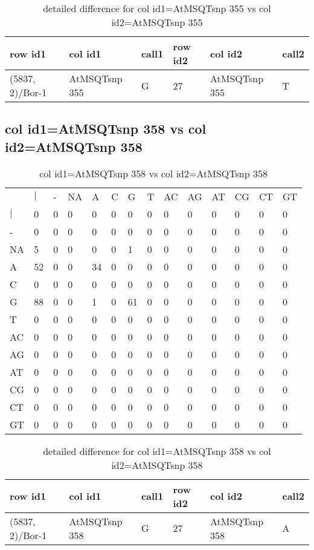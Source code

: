 \begin{center}
\begin{longtable}{|l|l|l|l|l|l|}
\caption{detailed difference for col id1=AtMSQTsnp 355 vs col id2=AtMSQTsnp 355} \label{table_dm675}\\
\hline
row id1&col id1&call1&row id2&col id2&call2\\
\hline
(5837, 2)/Bor-1&AtMSQTsnp 355&G&27&AtMSQTsnp 355&T\\
\hline
\end{longtable}
\end{center}

\subsection{col id1=AtMSQTsnp 358 vs col id2=AtMSQTsnp 358}
\begin{center}
\begin{longtable}{|l|l|l|l|l|l|l|l|l|l|l|l|l|l|}
\caption{col id1=AtMSQTsnp 358 vs col id2=AtMSQTsnp 358} \label{table_dm676}\\
\hline
\\
\hline
&$|$&-&NA&A&C&G&T&AC&AG&AT&CG&CT&GT\\
$|$&0&0&0&0&0&0&0&0&0&0&0&0&0\\
-&0&0&0&0&0&0&0&0&0&0&0&0&0\\
NA&5&0&0&0&0&1&0&0&0&0&0&0&0\\
A&52&0&0&34&0&0&0&0&0&0&0&0&0\\
C&0&0&0&0&0&0&0&0&0&0&0&0&0\\
G&88&0&0&1&0&61&0&0&0&0&0&0&0\\
T&0&0&0&0&0&0&0&0&0&0&0&0&0\\
AC&0&0&0&0&0&0&0&0&0&0&0&0&0\\
AG&0&0&0&0&0&0&0&0&0&0&0&0&0\\
AT&0&0&0&0&0&0&0&0&0&0&0&0&0\\
CG&0&0&0&0&0&0&0&0&0&0&0&0&0\\
CT&0&0&0&0&0&0&0&0&0&0&0&0&0\\
GT&0&0&0&0&0&0&0&0&0&0&0&0&0\\
\hline
\end{longtable}
\end{center}

\begin{center}
\begin{longtable}{|l|l|l|l|l|l|}
\caption{detailed difference for col id1=AtMSQTsnp 358 vs col id2=AtMSQTsnp 358} \label{table_dm677}\\
\hline
row id1&col id1&call1&row id2&col id2&call2\\
\hline
(5837, 2)/Bor-1&AtMSQTsnp 358&G&27&AtMSQTsnp 358&A\\
\hline
\end{longtable}
\end{center}

